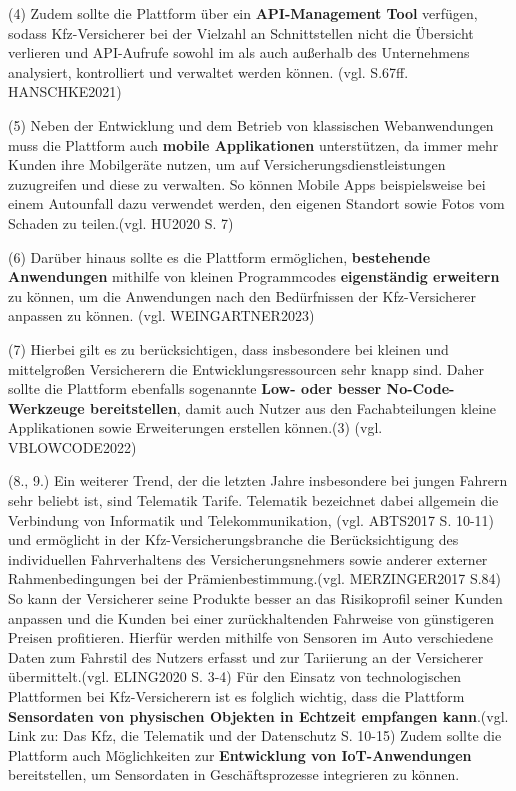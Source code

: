 (4) Zudem sollte die Plattform über ein \textbf{API-Management Tool} verfügen, sodass Kfz-Versicherer bei der Vielzahl an Schnittstellen nicht die Übersicht verlieren und API-Aufrufe sowohl im als auch außerhalb des Unternehmens analysiert, kontrolliert und verwaltet werden können. (vgl. S.67ff. HANSCHKE2021) 

(5) Neben der Entwicklung und dem Betrieb von klassischen Webanwendungen muss die Plattform auch \textbf{mobile Applikationen} unterstützen, da immer mehr Kunden ihre Mobilgeräte nutzen, um auf Versicherungsdienstleistungen zuzugreifen und diese zu verwalten. So können Mobile Apps beispielsweise bei einem Autounfall dazu verwendet werden, den eigenen Standort sowie Fotos vom Schaden zu teilen.(vgl. HU2020 S. 7)

(6) Darüber hinaus sollte es die Plattform ermöglichen, \textbf{bestehende Anwendungen} mithilfe von kleinen Programmcodes \textbf{eigenständig erweitern} zu können, um die Anwendungen nach den Bedürfnissen der Kfz-Versicherer anpassen zu können. (vgl. WEINGARTNER2023)

(7) Hierbei gilt es zu berücksichtigen, dass insbesondere bei kleinen und mittelgroßen Versicherern die Entwicklungsressourcen sehr knapp sind. Daher sollte die Plattform ebenfalls sogenannte \textbf{Low- oder besser No-Code-Werkzeuge bereitstellen}, damit auch Nutzer aus den Fachabteilungen kleine Applikationen sowie Erweiterungen erstellen können.(3) (vgl. VBLOWCODE2022)

(8., 9.) Ein weiterer Trend, der die letzten Jahre insbesondere bei jungen Fahrern sehr beliebt ist, sind Telematik Tarife. Telematik bezeichnet dabei allgemein die Verbindung von Informatik und Telekommunikation, (vgl. ABTS2017 S. 10-11) und ermöglicht in der Kfz-Versicherungsbranche die Berücksichtigung des individuellen Fahrverhaltens des Versicherungsnehmers sowie anderer externer Rahmenbedingungen bei der Prämienbestimmung.(vgl. MERZINGER2017 S.84) So kann der Versicherer seine Produkte besser an das Risikoprofil seiner Kunden anpassen und die Kunden bei einer zurückhaltenden Fahrweise von günstigeren Preisen profitieren. Hierfür werden mithilfe von Sensoren im Auto verschiedene Daten zum Fahrstil des Nutzers erfasst und zur Tariierung an der Versicherer übermittelt.(vgl. ELING2020 S. 3-4) Für den Einsatz von technologischen Plattformen bei Kfz-Versicherern ist es folglich wichtig, dass die Plattform \textbf{Sensordaten von physischen Objekten in Echtzeit empfangen kann}.(vgl. Link zu: Das Kfz, die Telematik und der Datenschutz S. 10-15) Zudem sollte die Plattform auch Möglichkeiten zur \textbf{Entwicklung von IoT-Anwendungen} bereitstellen, um Sensordaten in Geschäftsprozesse integrieren zu können. 

